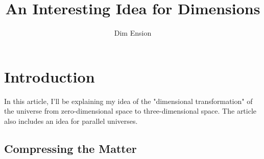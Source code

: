 \documentclass[12pt,oneside,a4paper]{article}
\title{An Interesting Idea for Dimensions}
\author{Dim Ension}
\begin{document}
\maketitle
\section{Introduction}
In this article, I'll be explaining my idea of the "dimensional transformation" of the universe from zero-dimensional space to three-dimensional  space. The article also includes an idea for parallel universes. 
\subsection{Compressing the Matter}
\end{document}
